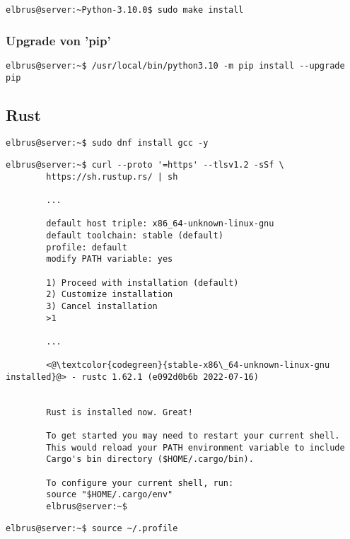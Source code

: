 \documentclass{article}
\begin{document}
	\begin{lstlisting}[caption={Installieren von Python.}]
		elbrus@server:~Python-3.10.0$ sudo make install
	\end{lstlisting}
	
	\subsubsection{Upgrade von 'pip'}
	\begin{lstlisting}[caption={Upgraden von 'pip'.}]
		elbrus@server:~$ /usr/local/bin/python3.10 -m pip install --upgrade pip
	\end{lstlisting}

	\subsection{Rust}
	
	\begin{lstlisting}[caption={Installieren von GNU Compiler Collection.}]
		elbrus@server:~$ sudo dnf install gcc -y
	\end{lstlisting}
	
	\lstset{style=commands}
	\begin{lstlisting}[caption={Installieren von Rust.}]
		elbrus@server:~$ curl --proto '=https' --tlsv1.2 -sSf \
		https://sh.rustup.rs/ | sh
		 
		...
		 
		default host triple: x86_64-unknown-linux-gnu
		default toolchain: stable (default)
		profile: default
		modify PATH variable: yes
		
		1) Proceed with installation (default)
		2) Customize installation
		3) Cancel installation
		>1
		
		...
		
		<@\textcolor{codegreen}{stable-x86\_64-unknown-linux-gnu installed}@> - rustc 1.62.1 (e092d0b6b 2022-07-16)
		
		
		Rust is installed now. Great!
		
		To get started you may need to restart your current shell.
		This would reload your PATH environment variable to include
		Cargo's bin directory ($HOME/.cargo/bin).
		
		To configure your current shell, run:
		source "$HOME/.cargo/env"
		elbrus@server:~$
	\end{lstlisting}
	
	\begin{lstlisting}[caption={Laden der Variablen aus dem Terminal Profil.}]
		elbrus@server:~$ source ~/.profile
	\end{lstlisting}
\end{document}
